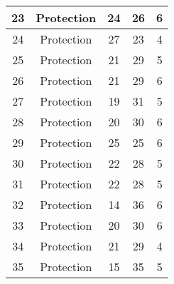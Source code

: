 \documentclass[results.tex]{subfiles}
\begin{document}
\begin{center}
\begin{tabular}{| c || c | c | c | c |}
            \hline
            23                      & Protection                   & 24                     & 26                      & 6                    \\
            \hline
            24                      & Protection                   & 27                     & 23                      & 4                    \\
            \hline
            25                      & Protection                   & 21                     & 29                      & 5                    \\
            \hline
            26                      & Protection                   & 21                     & 29                      & 6                    \\
            \hline
            27                      & Protection                   & 19                     & 31                      & 5                    \\
            \hline
            28                      & Protection                   & 20                     & 30                      & 6                    \\
            \hline
            29                      & Protection                   & 25                     & 25                      & 6                    \\
            \hline
            30                      & Protection                   & 22                     & 28                      & 5                    \\
            \hline
            31                      & Protection                   & 22                     & 28                      & 5                    \\
            \hline
            32                      & Protection                   & 14                     & 36                      & 6                    \\
            \hline
            33                      & Protection                   & 20                     & 30                      & 6                    \\
            \hline
            34                      & Protection                   & 21                     & 29                      & 4                    \\
            \hline
            35                      & Protection                   & 15                     & 35                      & 5                    \\

\end{tabular}
\end{center}
\end{document}
